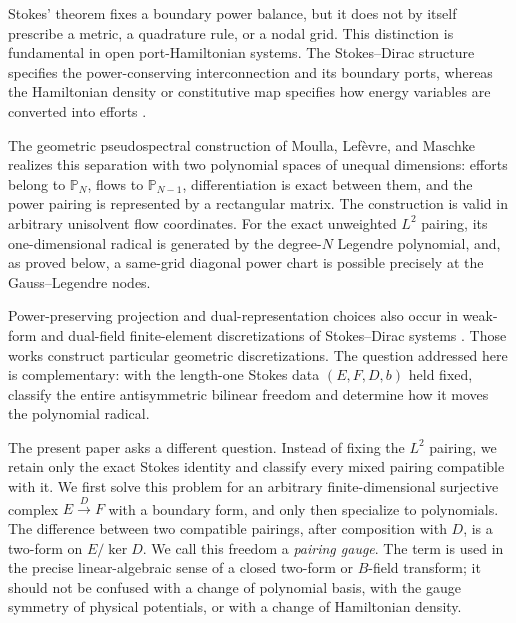 \documentclass[11pt,a4paper]{article}
\theoremstyle{definition}
\theoremstyle{remark}
\newcommand{\Pp}{\mathbb{P}}
\newcommand{\Ker}{\operatorname{ker}}
\begin{document}
Stokes' theorem fixes a boundary power balance, but it does not by itself prescribe a metric,
a quadrature rule, or a nodal grid.  This distinction is fundamental in open
port-Hamiltonian systems.  The Stokes--Dirac structure specifies the power-conserving
interconnection and its boundary ports, whereas the Hamiltonian density or constitutive map
specifies how energy variables are converted into efforts
\cite{vanderschaftmaschke2002,legorrec2005}.

The geometric pseudospectral construction of Moulla, Lef\`evre, and Maschke
\cite{moulla2012} realizes this separation with two polynomial spaces of unequal dimensions:
efforts belong to $\Pp_N$, flows to $\Pp_{N-1}$, differentiation is exact between them, and
the power pairing is represented by a rectangular matrix.  The construction is valid in
arbitrary unisolvent flow coordinates.  For the exact unweighted $L^2$ pairing, its
one-dimensional radical is generated by the degree-$N$ Legendre polynomial, and, as proved
below, a same-grid diagonal power chart is possible precisely at the Gauss--Legendre nodes.

Power-preserving projection and dual-representation choices also occur in weak-form and
dual-field finite-element discretizations of Stokes--Dirac systems
\cite{kotyczka2018,brugnolirashad2022}.  Those works construct particular geometric
discretizations.  The question addressed here is complementary: with the length-one Stokes
data $(E,F,D,b)$ held fixed, classify the entire antisymmetric bilinear freedom and determine
how it moves the polynomial radical.

The present paper asks a different question.  Instead of fixing the $L^2$ pairing, we retain
only the exact Stokes identity and classify every mixed pairing compatible with it.  We first
solve this problem for an arbitrary finite-dimensional surjective complex $E\xrightarrow D F$
with a boundary form, and only then specialize to polynomials.  The difference between two
compatible pairings, after composition with $D$, is a two-form on $E/\Ker D$.  We call this freedom a
\emph{pairing gauge}.  The term is used in the precise linear-algebraic sense of a closed
two-form or $B$-field transform; it should not be confused with a change of polynomial basis,
with the gauge symmetry of physical potentials, or with a change of Hamiltonian density.
\end{document}
